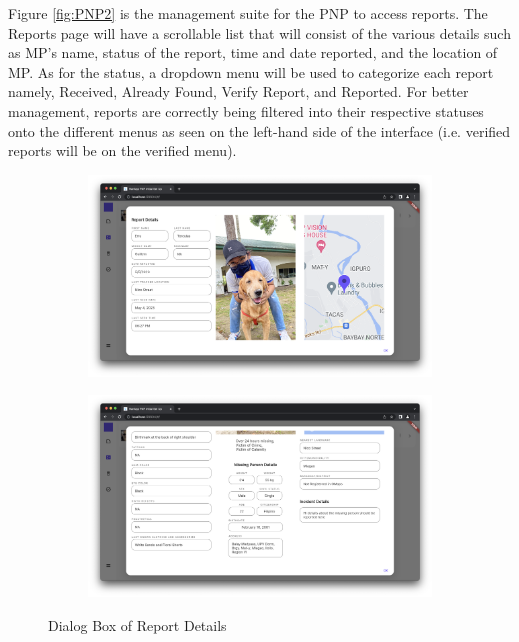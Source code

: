 Figure \ref{fig:PNP2} is the management suite for the PNP to access reports. The Reports page will have a scrollable list that will consist of the various details such as MP’s name, status of the report, time and date reported, and the location of MP. As for the status, a dropdown menu will be used to categorize each report namely, Received, Already Found, Verify Report, and Reported. For better management, reports are correctly being filtered into their respective statuses onto the different menus as seen on the left-hand side of the interface (i.e. verified reports will be on the verified menu).

\begin{figure}[!h]
    \centering
    \begin{subfigure}[c]{1\linewidth}
        \centering
        \includegraphics[scale=0.25]{figures/Chapter4/PNP/reportDetails-1.png}
    \end{subfigure}
    \centering
    \begin{subfigure}[c]{1\linewidth}
        \centering
        \includegraphics[scale=0.25]{figures/Chapter4/PNP/reportDetails-2.png}
    \end{subfigure}
    \caption{Dialog Box of Report Details}
    \label{fig:reportDetails}
\end{figure}


